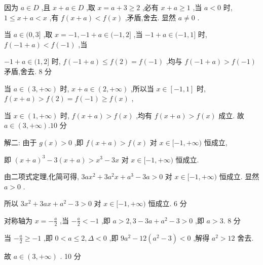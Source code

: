 \documentclass[10pt]{article}
\begin{document}
因为 \(a \in  D\) ,且 \(x + a \in  D\) ,取 \(x = a + 3 \geq  2\) ,必有 \(x + a \geq  1\) ,当 \(a < 0\) 时, \(1 \leq  x + a < x\) ,有 \(f\left( {x + a}\right)  < f\left( x\right)\) ,矛盾,舍去. 显然 \(a \neq  0\) .

当 \(a \in  (0,3\rbrack\) ,取 \(x =  - 1, - 1 + a \in  ( - 1,2\rbrack\) ,当 \(- 1 + a \in  ( - 1,1\rbrack\) 时, \(f\left( {-1 + a}\right)  < f\left( {-1}\right)\) ,当

\(- 1 + a \in  (1,2\rbrack\) 时, \(f\left( {-1 + a}\right)  \leq  f\left( 2\right)  = f\left( {-1}\right)\) ,均与 \(f\left( {-1 + a}\right)  > f\left( {-1}\right)\) 矛盾,舍去. 8 分

当 \(a \in  \left( {3, + \infty }\right)\) 时, \(x + a \in  \left( {2, + \infty }\right)\) ,所以当 \(x \in  \left\lbrack  {-1,1}\right\rbrack\) 时, \(f\left( {x + a}\right)  > f\left( 2\right)  = f\left( {-1}\right)  \geq  f\left( x\right)\) ,

当 \(x \in  \left( {1, + \infty }\right)\) 时, \(f\left( {x + a}\right)  > f\left( x\right)\) ,均有 \(f\left( {x + a}\right)  > f\left( x\right)\) 成立. 故 \(a \in  \left( {3, + \infty }\right) .{10}\) 分

解二: 由于 \(g\left( x\right)  > 0\) ,即 \(f\left( {x + a}\right)  > f\left( x\right)\) 对 \(x \in  \lbrack  - 1, + \infty )\) 恒成立,

即 \({\left( x + a\right) }^{3} - 3\left( {x + a}\right)  > {x}^{3} - {3x}\) 对 \(x \in  \lbrack  - 1, + \infty )\) 恒成立.

由二项式定理,化简可得, \({3a}{x}^{2} + 3{a}^{2}x + {a}^{3} - {3a} > 0\) 对 \(x \in  \lbrack  - 1, + \infty )\) 恒成立. 显然 \(a > 0\) .

所以 \(3{x}^{2} + {3ax} + {a}^{2} - 3 > 0\) 对 \(x \in  \lbrack  - 1, + \infty )\) 恒成立. 6 分

对称轴为 \(x =  - \frac{a}{2}\) ,当 \(- \frac{a}{2} <  - 1\) ,即 \(a > 2,3 - {3a} + {a}^{2} - 3 > 0\) ,即 \(a > 3.\) 8 分

当 \(- \frac{a}{2} \geq   - 1\) ,即 \(0 < a \leq  2,\Delta  < 0\) ,即 \(9{a}^{2} - {12}\left( {{a}^{2} - 3}\right)  < 0\) ,解得 \({a}^{2} > {12}\) 舍去.

故 \(a \in  \left( {3, + \infty }\right)\) . 10 分
\end{document}
